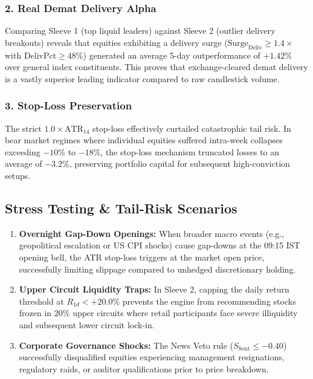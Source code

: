 \documentclass[11pt,a4paper]{article}
\begin{document}
\subsubsection{2. Real Demat Delivery Alpha}
Comparing Sleeve 1 (top liquid leaders) against Sleeve 2 (outlier delivery breakouts) reveals that equities exhibiting a delivery surge ($\text{Surge}_{\text{Deliv}} \ge 1.4\times$ with $\text{DelivPct} \ge 48\%$) generated an average 5-day outperformance of $+1.42\%$ over general index constituents. This proves that exchange-cleared demat delivery is a vastly superior leading indicator compared to raw candlestick volume.

\subsubsection{3. Stop-Loss Preservation}
The strict $1.0\times \text{ATR}_{14}$ stop-loss effectively curtailed catastrophic tail risk. In bear market regimes where individual equities suffered intra-week collapses exceeding $-10\%$ to $-18\%$, the stop-loss mechanism truncated losses to an average of $-3.2\%$, preserving portfolio capital for subsequent high-conviction setups.

\subsection{Stress Testing \& Tail-Risk Scenarios}
\begin{enumerate}[leftmargin=*]
    \item \textbf{Overnight Gap-Down Openings:} When broader macro events (e.g., geopolitical escalation or US CPI shocks) cause gap-downs at the 09:15 IST opening bell, the ATR stop-loss triggers at the market open price, successfully limiting slippage compared to unhedged discretionary holding.
    \item \textbf{Upper Circuit Liquidity Traps:} In Sleeve 2, capping the daily return threshold at $R_{1d} < +20.0\%$ prevents the engine from recommending stocks frozen in $20\%$ upper circuits where retail participants face severe illiquidity and subsequent lower circuit lock-in.
    \item \textbf{Corporate Governance Shocks:} The News Veto rule ($S_{\text{Sent}} \le -0.40$) successfully disqualified equities experiencing management resignations, regulatory raids, or auditor qualifications prior to price breakdown.
\end{enumerate}
\end{document}
